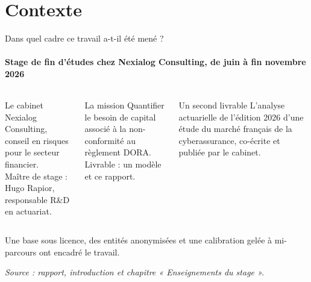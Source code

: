 \documentclass[aspectratio=169,10pt,t]{beamer}
\newcommand{\source}[1]{\par\vfill{\tiny\color{gris}\textit{Source : #1}}\par\vspace{-1mm}}
\begin{document}
\section{Contexte}
\begin{frame}{Dans quel cadre ce travail a-t-il été mené ?}
  \suivimethode{}{}
  \framesubtitle{Stage de fin d'études chez Nexialog Consulting, de juin à fin novembre 2026}
  \begin{columns}[T]
    \begin{block}{Le cabinet}
      \small Nexialog Consulting, conseil en risques pour le secteur financier.\\[1mm]
      Maître de stage : Hugo Rapior, responsable R\&D en actuariat.
    \end{block}
    \begin{alertblock}{La mission}
      \small Quantifier le besoin de capital associé à la non-conformité au règlement DORA.\\[1mm]
      Livrable : un modèle et ce rapport.
    \end{alertblock}
    \begin{block}{Un second livrable}
      \small L'analyse actuarielle de l'édition 2026 d'une étude du marché français de la cyberassurance,
      co-écrite et publiée par le cabinet.
    \end{block}
  \end{columns}
  \vspace{4mm}
  \small Une base sous licence, des entités anonymisées et une calibration gelée à mi-parcours ont encadré le travail.
  \source{rapport, introduction et chapitre « Enseignements du stage ».}
\end{frame}
\end{document}
